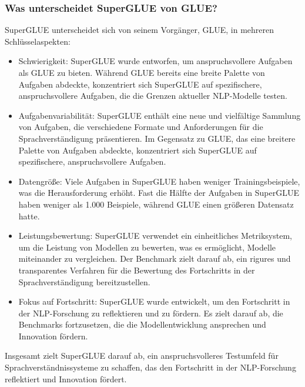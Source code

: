 \subsubsection*{Was unterscheidet SuperGLUE von GLUE?}

SuperGLUE unterscheidet sich von seinem Vorgänger, GLUE, in mehreren Schlüsselaspekten:

\begin{itemize}
\item Schwierigkeit: SuperGLUE wurde entworfen, um anspruchsvollere Aufgaben als GLUE zu bieten. Während GLUE bereits eine breite Palette von Aufgaben abdeckte, konzentriert sich SuperGLUE auf spezifischere, anspruchsvollere Aufgaben, die die Grenzen aktueller NLP-Modelle testen.
\item Aufgabenvariabilität: SuperGLUE enthält eine neue und vielfältige Sammlung von Aufgaben, die verschiedene Formate und Anforderungen für die Sprachverständigung präsentieren. Im Gegensatz zu GLUE, das eine breitere Palette von Aufgaben abdeckte, konzentriert sich SuperGLUE auf spezifischere, anspruchsvollere Aufgaben.
\item Datengröße: Viele Aufgaben in SuperGLUE haben weniger Trainingsbeispiele, was die Herausforderung erhöht. Fast die Hälfte der Aufgaben in SuperGLUE haben weniger als 1.000 Beispiele, während GLUE einen größeren Datensatz hatte.
\item Leistungsbewertung: SuperGLUE verwendet ein einheitliches Metriksystem, um die Leistung von Modellen zu bewerten, was es ermöglicht, Modelle miteinander zu vergleichen. Der Benchmark zielt darauf ab, ein rigures und transparentes Verfahren für die Bewertung des Fortschritts in der Sprachverständigung bereitzustellen.
\item Fokus auf Fortschritt: SuperGLUE wurde entwickelt, um den Fortschritt in der NLP-Forschung zu reflektieren und zu fördern. Es zielt darauf ab, die Benchmarks fortzusetzen, die die Modellentwicklung ansprechen und Innovation fördern.
\end{itemize}

Insgesamt zielt SuperGLUE darauf ab, ein anspruchsvolleres Testumfeld für Sprachverständnissysteme zu schaffen, das den Fortschritt in der NLP-Forschung reflektiert und Innovation fördert.